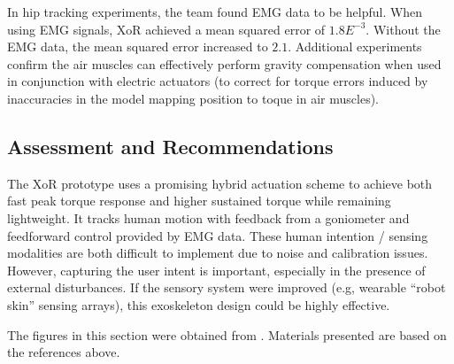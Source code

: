 \begin{refsection}
In hip tracking experiments, the team found EMG data to be helpful.  When using EMG signals, XoR achieved a mean squared error of $1.8E^{-3}$.  Without the EMG data, the mean squared error increased to $2.1$.  Additional experiments confirm the air muscles can effectively perform gravity compensation when used in conjunction with electric actuators (to correct for torque errors induced by inaccuracies in the model mapping position to toque in air muscles).


\subsection{Assessment and Recommendations}

The XoR prototype uses a promising hybrid actuation scheme to achieve both fast peak torque response and higher sustained torque while remaining lightweight.  It tracks human motion with feedback from a goniometer and feedforward control provided by EMG data.  These human intention / sensing modalities are both difficult to implement due to noise and calibration issues.  However, capturing the user intent is important, especially in the presence of external disturbances.  If the sensory system were improved (e.g, wearable ``robot skin'' sensing arrays), this exoskeleton design could be highly effective. 

\nocite{*}
\printbibliography[heading=subbibliography]

The figures in this section were obtained from \cite{xorDesign2011,XoRkinemExtraction2012}. Materials presented are based on the references above.

\end{refsection}